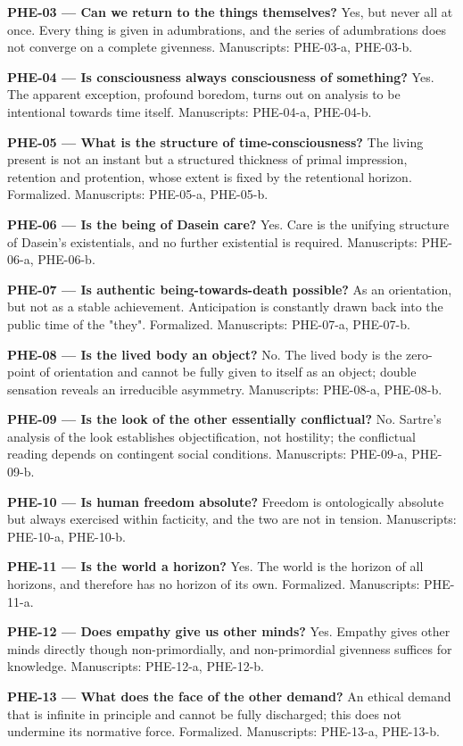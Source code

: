 \documentclass[10pt]{article}
\begin{document}
\textbf{PHE-03 --- Can we return to the things themselves?} Yes, but never all at once. Every thing is given in adumbrations, and the series of adumbrations does not converge on a complete givenness. Manuscripts: PHE-03-a, PHE-03-b.

\textbf{PHE-04 --- Is consciousness always consciousness of something?} Yes. The apparent exception, profound boredom, turns out on analysis to be intentional towards time itself. Manuscripts: PHE-04-a, PHE-04-b.

\textbf{PHE-05 --- What is the structure of time-consciousness?} The living present is not an instant but a structured thickness of primal impression, retention and protention, whose extent is fixed by the retentional horizon. Formalized. Manuscripts: PHE-05-a, PHE-05-b.

\textbf{PHE-06 --- Is the being of Dasein care?} Yes. Care is the unifying structure of Dasein's existentials, and no further existential is required. Manuscripts: PHE-06-a, PHE-06-b.

\textbf{PHE-07 --- Is authentic being-towards-death possible?} As an orientation, but not as a stable achievement. Anticipation is constantly drawn back into the public time of the "they". Formalized. Manuscripts: PHE-07-a, PHE-07-b.

\textbf{PHE-08 --- Is the lived body an object?} No. The lived body is the zero-point of orientation and cannot be fully given to itself as an object; double sensation reveals an irreducible asymmetry. Manuscripts: PHE-08-a, PHE-08-b.

\textbf{PHE-09 --- Is the look of the other essentially conflictual?} No. Sartre's analysis of the look establishes objectification, not hostility; the conflictual reading depends on contingent social conditions. Manuscripts: PHE-09-a, PHE-09-b.

\textbf{PHE-10 --- Is human freedom absolute?} Freedom is ontologically absolute but always exercised within facticity, and the two are not in tension. Manuscripts: PHE-10-a, PHE-10-b.

\textbf{PHE-11 --- Is the world a horizon?} Yes. The world is the horizon of all horizons, and therefore has no horizon of its own. Formalized. Manuscripts: PHE-11-a.

\textbf{PHE-12 --- Does empathy give us other minds?} Yes. Empathy gives other minds directly though non-primordially, and non-primordial givenness suffices for knowledge. Manuscripts: PHE-12-a, PHE-12-b.

\textbf{PHE-13 --- What does the face of the other demand?} An ethical demand that is infinite in principle and cannot be fully discharged; this does not undermine its normative force. Formalized. Manuscripts: PHE-13-a, PHE-13-b.
\end{document}
